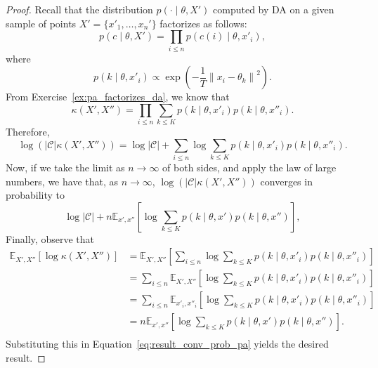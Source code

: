\begin{proof}
Recall that the distribution $p(\cdot \mid \theta, X')$ computed by DA on a given sample of points $X' = \{x'_1, \ldots, x_n'\}$ factorizes as follows:
%
\begin{equation}
p(c \mid \theta, X') = \prod_{i \leq n} p(c(i) \mid \theta, x'_i),
\end{equation}
%
where
%
\begin{equation}
p(k \mid \theta, x'_i) \propto \exp\left(-\frac{1}{T}\left\|x_i - \theta_k\right\|^2\right).
\end{equation}
%
From Exercise~\ref{ex:pa_factorizes_da}, we know that
%
\begin{equation}
\kappa\left(X', X''\right) = \prod_{i \leq n} \sum_{k \leq K} p(k \mid \theta, x'_i)p(k \mid \theta, x''_i).
\end{equation}
%
Therefore,
%
\begin{equation}
\log \left(\left|\mathcal{C}\right|\kappa\left(X', X''\right)\right) = \log \left|\mathcal{C}\right| + \sum_{i \leq n}\log \sum_{k \leq K} p(k \mid \theta, x'_i)p(k \mid \theta, x''_i).
\end{equation}
%
Now, if we take the limit as $n \to \infty$ of both sides, and apply the law of large numbers, we have that, as $n \to \infty$, $\log \left(\left|\mathcal{C}\right|\kappa\left(X', X''\right)\right)$ converges in probability to
%
\begin{equation}
\log \left|\mathcal{C}\right| + n \mathbb{E}_{x', x''}\left[\log \sum_{k \leq K} p(k \mid \theta, x')p(k \mid \theta, x'')\right],
\label{eq:result_conv_prob_pa}
\end{equation}
%
Finally, observe that
%
\begin{align}
\mathbb{E}_{X', X''}\left[\log \kappa\left(X', X''\right)\right]
&= \mathbb{E}_{X', X''}\left[\sum_{i \leq n}\log \sum_{k \leq K} p(k \mid \theta, x'_i)p(k \mid \theta, x''_i)\right]\\
&= \sum_{i \leq n}\mathbb{E}_{X', X''}\left[\log \sum_{k \leq K} p(k \mid \theta, x'_i)p(k \mid \theta, x''_i)\right]\\
&= \sum_{i \leq n}\mathbb{E}_{x'_i, x''_i}\left[\log \sum_{k \leq K} p(k \mid \theta, x'_i)p(k \mid \theta, x''_i)\right]\\
&= n\mathbb{E}_{x', x''}\left[\log \sum_{k \leq K} p(k \mid \theta, x')p(k \mid \theta, x'')\right].\\
\end{align}
%
Substituting this in Equation~\ref{eq:result_conv_prob_pa} yields the desired result.
\end{proof}

